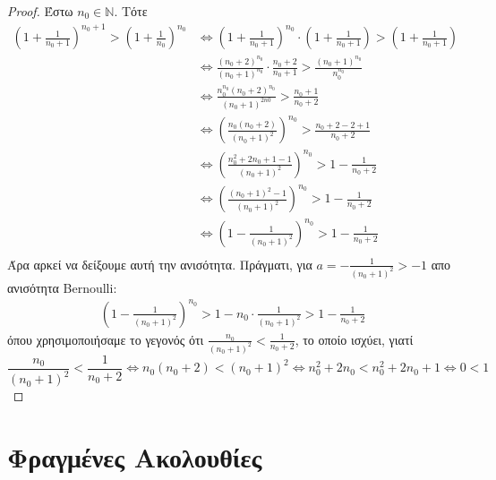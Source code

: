 \documentclass[main.tex]{subfiles}
\begin{document}
\begin{proof}
\item {}
  Έστω $ n_{0} \in \mathbb{N} $. Τότε 
  \begin{align*}
    \left(1+ \frac{1}{n_{0}+1} \right)^{n_{0}+1} > 
    \left(1+ \frac{1}{n_{0}} \right)^{n_{0}} 
        &\Leftrightarrow \left(1+ \frac{1}{n_{0}+1} \right)^{n_{0}} 
        \cdot \left(1 + \frac{1}{n_{0} +1} \right) > \left(1+ \frac{1}{n_{0}+1} 
        \right) \\
        & \Leftrightarrow \frac{(n_{0}+2)^{n_{0}}}{(n_{0}+1)^{n_{0}}} \cdot 
        \frac{n_{0}+2}{n_{0}+1} > \frac{(n_{0}+1)^{n_{0}}}{n_{0}^{n_{0}}} \\
        & \Leftrightarrow \frac{n_{0}^{n_{0}}(n_{0}+2)^{n_{0}}}{(n_{0}+1)^{2n0}} > 
        \frac{n_{0}+1}{n_{0}+2} \\
        & \Leftrightarrow \left(\frac{n_{0}(n_{0}+2)}{(n_{0}+1)^{2}}\right)^{n_{0}} > 
        \frac{n_{0}+2-2+1}{n_{0}+2} \\
        & \Leftrightarrow \left(\frac{n_{0}^{2}+2 n_{0}+1-1}{(n_{0}+1)^{2}}\right)
        ^{n_{0}} > 1-\frac{1}{n_{0}+2} \\
        & \Leftrightarrow \left(\frac{(n_{0}+1)^{2}-1}{(n_{0}+1)^{2}} \right)^{n_{0}}
        > 1 - \frac{1}{n_{0}+2} \\
        & \Leftrightarrow \left(1 - \frac{1}{(n_{0}+1)^{2}} \right)^{n_{0} } > 1 - 
        \frac{1}{n_{0}+2} \\
  \end{align*} 
  Άρα αρκεί να δείξουμε αυτή την ανισότητα. Πράγματι,
  για $ a = - \frac{1}{(n_{0}+1)^{2}} > -1 $ απο ανισότητα Bernoulli: 
  \begin{align*}
    \left(1- \frac{1}{(n_{0}+1)^{2}}\right)^{n_{0}} > 1 - n_{0}\cdot 
    \frac{1}{(n_{0}+1)^{2}} > 1 - \frac{1}{n_{0}+2} 
  \end{align*}
  όπου χρησιμοποιήσαμε το γεγονός ότι $ \frac{n_{0}}{(n_{0}+1)^{2}} < 
  \frac{1}{n_{0}+2}  $, το οποίο ισχύει, γιατί 
  \[
    \frac{n_{0}}{(n_{0}+1)^{2}} < \frac{1}{n_{0}+2} 
    \Leftrightarrow n_{0}(n_{0}+2) < (n_{0}+1)^{2} 
    \Leftrightarrow n_{0}^{2}+2 n_{0} < n_{0}^{2} + 2 n_{0}+1 
    \Leftrightarrow 0 < 1
  \]
\end{proof}

\section{Φραγμένες Ακολουθίες}
\end{document}
